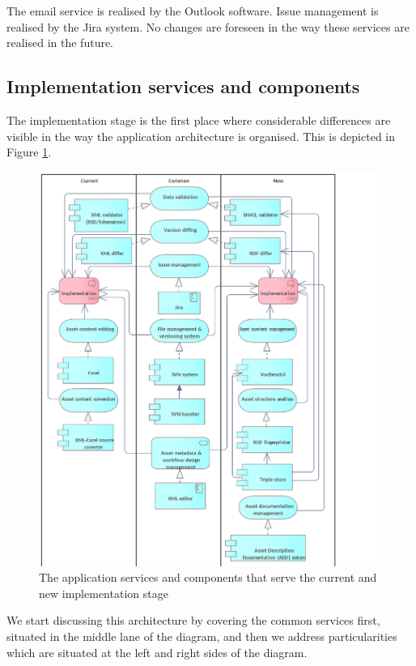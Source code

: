 	The email service is realised by the Outlook software. Issue management is realised by the Jira system. No changes are foreseen in the way these services are realised in the future. 

	\subsection{Implementation services and components}
	\label{sec:implementation-application}	
	
	The implementation stage is the first place where considerable differences are visible in the way the application architecture is organised. This is depicted in Figure \ref{fig:application-implementation}.
	
	\begin{figure}[!h]
		\centering
		\includegraphics[width=.9\textwidth]{images/application/Implementation v3.png}
		\caption{The application services and components that serve the current and new implementation stage}
		\label{fig:application-implementation}
	\end{figure}
	
	We start discussing this architecture by covering the common services first, situated in the middle lane of the diagram, and then we address particularities which are situated at the left and right sides of the diagram. 
	

